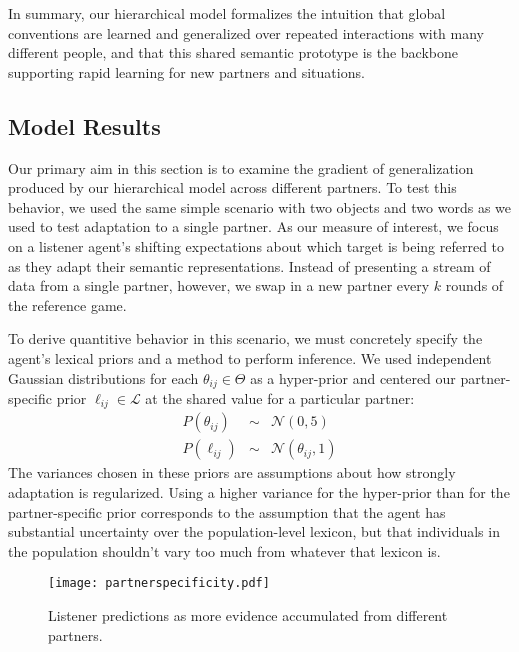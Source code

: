 In summary, our hierarchical model formalizes the intuition that global conventions are learned and generalized over repeated interactions with many different people, and that this shared semantic prototype is the backbone supporting rapid learning for new partners and situations. 

\subsection{Model Results}

Our primary aim in this section is to examine the gradient of generalization produced by our hierarchical model across different partners.
To test this behavior, we used the same simple scenario with two objects and two words as we used to test adaptation to a single partner.
As our measure of interest, we focus on a listener agent's shifting expectations about which target is being referred to as they adapt their semantic representations.
Instead of presenting a stream of data from a single partner, however, we swap in a new partner every $k$ rounds of the reference game.

To derive quantitive behavior in this scenario, we must concretely specify the agent's lexical priors and a method to perform inference.
We used independent Gaussian distributions for each $\theta_{ij} \in \Theta$ as a hyper-prior and centered our partner-specific prior $\ell_{ij} \in \mathcal{L}$ at the shared value for a particular partner:
$$\begin{array}{rcl}
P(\theta_{ij}) & \sim & \mathcal{N}(0, 5)\\
P(\ell_{ij}) & \sim & \mathcal{N}(\theta_{ij}, 1)
\end{array}$$
The variances chosen in these priors are assumptions about how strongly adaptation is regularized. 
Using a higher variance for the hyper-prior than for the partner-specific prior corresponds to the assumption that the agent has substantial uncertainty over the population-level lexicon, but that individuals in the population shouldn't vary too much from whatever that lexicon is.

\begin{figure}
\centering
    \texttt{[image: partnerspecificity.pdf]}
  \caption{Listener predictions as more evidence accumulated from different partners.}
  \label{fig:specificity}
\end{figure}

